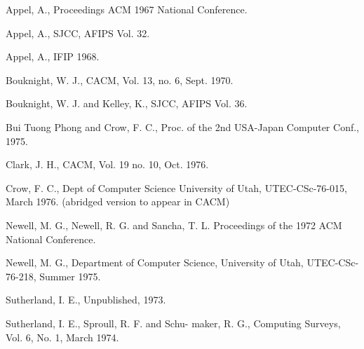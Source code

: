 \documentclass[a4paper, twocolumn]{article}
\begin{document}
\begin{CJK}{UTF8}{gbsn}
\begin{thebibliography}{99}
		Appel, A.,
		\newblock Proceedings ACM 1967 National Conference.
		
		Appel, A.,
		 SJCC, AFIPS Vol. 32.
		
		Appel, A.,
		\newblock IFIP 1968.
		
		Bouknight, W. J.,
		\newblock CACM, Vol. 13, no. 6, Sept. 1970.
		
		Bouknight, W. J. and Kelley, K.,
		 SJCC, AFIPS Vol. 36.
		
		Bui Tuong Phong and Crow, F. C.,
		\newblock Proc. of the 2nd USA-Japan Computer Conf., 1975.
		
		Clark, J. H.,
		\newblock CACM, Vol. 19 no. 10, Oct. 1976.
		
		Crow, F. C.,
		\newblock Dept of Computer Science University of Utah, UTEC-CSc-76-015, March 1976. (abridged version to appear in CACM)
		
		Newell, M. G., Newell, R. G. and Sancha, T. L.
		\newblock Proceedings of the 1972 ACM National Conference.
		
		Newell, M. G.,
		\newblock Department of Computer Science, University of Utah, UTEC-CSc-76-218, Summer 1975.
		
		Sutherland, I. E.,
		\newblock Unpublished, 1973.
		
		Sutherland, I. E., Sproull, R. F. and Schu- maker, R. G.,
		\newblock Computing Surveys, Vol. 6, No. 1, March 1974.
		
	\end{thebibliography}
	
\end{CJK}	
\end{document}
